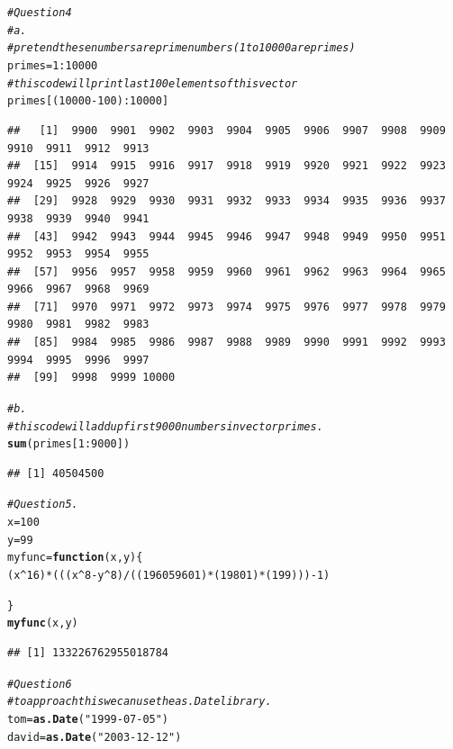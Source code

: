 \documentclass{article}\usepackage[]{graphicx}\usepackage[]{xcolor}
\makeatletter
\newcommand{\hlnum}[1]{\textcolor[rgb]{0.686,0.059,0.569}{#1}}%
\newcommand{\hlstr}[1]{\textcolor[rgb]{0.192,0.494,0.8}{#1}}%
\newcommand{\hlcom}[1]{\textcolor[rgb]{0.678,0.584,0.686}{\textit{#1}}}%
\newcommand{\hlopt}[1]{\textcolor[rgb]{0,0,0}{#1}}%
\newcommand{\hlstd}[1]{\textcolor[rgb]{0.345,0.345,0.345}{#1}}%
\newcommand{\hlkwa}[1]{\textcolor[rgb]{0.161,0.373,0.58}{\textbf{#1}}}%
\newcommand{\hlkwb}[1]{\textcolor[rgb]{0.69,0.353,0.396}{#1}}%
\newcommand{\hlkwc}[1]{\textcolor[rgb]{0.333,0.667,0.333}{#1}}%
\newcommand{\hlkwd}[1]{\textcolor[rgb]{0.737,0.353,0.396}{\textbf{#1}}}%
\newenvironment{kframe}{%
 \def\at@end@of@kframe{}%
 \ifinner\ifhmode%
  \def\at@end@of@kframe{\end{minipage}}%
  \begin{minipage}{\columnwidth}%
 \fi\fi%
 \def\FrameCommand##1{\hskip\@totalleftmargin \hskip-\fboxsep
 \colorbox{shadecolor}{##1}\hskip-\fboxsep
     \hskip-\linewidth \hskip-\@totalleftmargin \hskip\columnwidth}%
 \MakeFramed {\advance\hsize-\width
   \@totalleftmargin\z@ \linewidth\hsize
   \@setminipage}}%
 {\par\unskip\endMakeFramed%
 \at@end@of@kframe}
\newenvironment{knitrout}{}{} %
\makeatother
\begin{document}
\begin{knitrout}
\begin{kframe}
\begin{alltt}
\hlcom{# Question 4}
\hlcom{# a. }
\hlcom{# pretend these numbers are prime numbers (1 to 10000 are primes)}
\hlstd{primes} \hlkwb{=} \hlnum{1}\hlopt{:}\hlnum{10000}
\hlcom{# this code will print last 100 elements of this vector}
\hlstd{primes[(}\hlnum{10000}\hlopt{-}\hlnum{100}\hlstd{)}\hlopt{:}\hlnum{10000}\hlstd{]}
\end{alltt}
\begin{verbatim}
##   [1]  9900  9901  9902  9903  9904  9905  9906  9907  9908  9909  9910  9911  9912  9913
##  [15]  9914  9915  9916  9917  9918  9919  9920  9921  9922  9923  9924  9925  9926  9927
##  [29]  9928  9929  9930  9931  9932  9933  9934  9935  9936  9937  9938  9939  9940  9941
##  [43]  9942  9943  9944  9945  9946  9947  9948  9949  9950  9951  9952  9953  9954  9955
##  [57]  9956  9957  9958  9959  9960  9961  9962  9963  9964  9965  9966  9967  9968  9969
##  [71]  9970  9971  9972  9973  9974  9975  9976  9977  9978  9979  9980  9981  9982  9983
##  [85]  9984  9985  9986  9987  9988  9989  9990  9991  9992  9993  9994  9995  9996  9997
##  [99]  9998  9999 10000
\end{verbatim}
\begin{alltt}
\hlcom{#b. }
\hlcom{#this code will add up first 9000 numbers in vector primes.}
\hlkwd{sum}\hlstd{(primes[}\hlnum{1}\hlopt{:}\hlnum{9000}\hlstd{])}
\end{alltt}
\begin{verbatim}
## [1] 40504500
\end{verbatim}
\begin{alltt}
\hlcom{# Question 5.}
\hlstd{x} \hlkwb{=} \hlnum{100}
\hlstd{y} \hlkwb{=} \hlnum{99}
\hlstd{myfunc} \hlkwb{=} \hlkwa{function}\hlstd{(}\hlkwc{x}\hlstd{,}\hlkwc{y}\hlstd{)\{}
  \hlstd{(x}\hlopt{^}\hlnum{16}\hlstd{)}\hlopt{*}\hlstd{(((x}\hlopt{^}\hlnum{8} \hlopt{-} \hlstd{y}\hlopt{^}\hlnum{8}\hlstd{)} \hlopt{/} \hlstd{((}\hlnum{196059601}\hlstd{)}\hlopt{*}\hlstd{(}\hlnum{19801}\hlstd{)}\hlopt{*}\hlstd{(}\hlnum{199}\hlstd{)))} \hlopt{-} \hlnum{1}\hlstd{)}

\hlstd{\}}
\hlkwd{myfunc}\hlstd{(x,y)}
\end{alltt}
\begin{verbatim}
## [1] 133226762955018784
\end{verbatim}
\begin{alltt}
\hlcom{# Question 6}
\hlcom{# to approach this we can use the as.Date library.}
\hlstd{tom} \hlkwb{=} \hlkwd{as.Date}\hlstd{(}\hlstr{"1999-07-05"}\hlstd{)}
\hlstd{david} \hlkwb{=} \hlkwd{as.Date}\hlstd{(}\hlstr{"2003-12-12"}\hlstd{)}


\end{alltt}
\end{kframe}
\end{knitrout}
\end{document}
